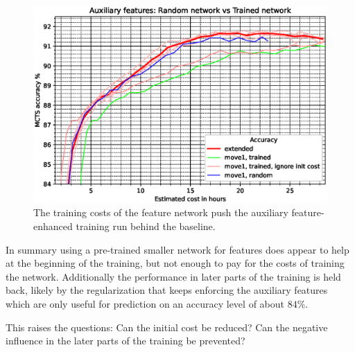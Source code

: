 \documentclass[12pt,onecolumn,oneside,titlepage]{article}
\begin{document}
\begin{figure}[H]
\centering
\includegraphics[clip,width=\columnwidth]{rndVsTrainedAux}
\caption{The training costs of the feature network push the auxiliary feature-enhanced training run behind the baseline.}
\label{fig:rndVsTrainedAux}
\end{figure}



In summary using a pre-trained smaller network for features does appear to help at the beginning of the training, but not enough to pay for the costs of training the network. Additionally the performance in later parts of the training is held back, likely by the
regularization that keeps enforcing the auxiliary features which are only useful for prediction on an accuracy level of about $84\%$.

This raises the questions: Can the initial cost be reduced? Can the negative influence in the later parts of the training be prevented?
\end{document}
